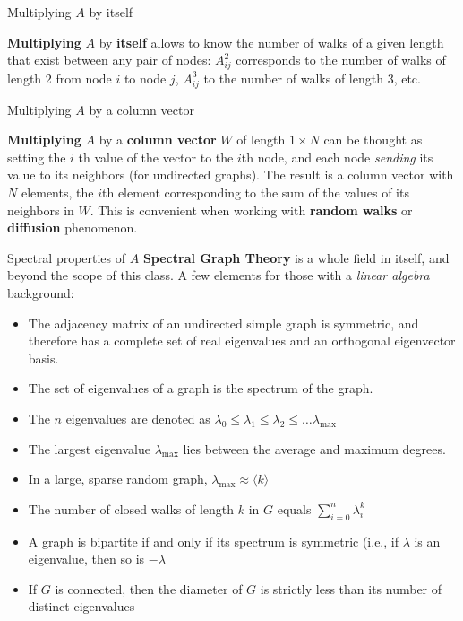 \documentclass[a4paper,11pt]{book}
\begin{document}
\begin{textbox}{Multiplying $A$ by itself}


\textbf{Multiplying} $A$ by \textbf{itself} allows to know the number of walks of a given length that exist between any pair of nodes: $A^2_{ij}$ corresponds to the number of walks of length 2 from node $i$ to node $j$, $A^3_{ij}$ to the number of walks of length 3, etc.
\end{textbox}

\begin{textbox}{Multiplying $A$ by a column vector}

\textbf{Multiplying} $A$ by a \textbf{column vector} $W$ of length $1\times N$ can be thought as setting the $i$ th value of the vector to the $i$th node, and each node \textit{sending} its value to its neighbors (for undirected graphs). The result is a column vector with $N$ elements, the $i$th element corresponding to the sum of the values of its neighbors in $W$. This is convenient when working with \textbf{random walks} or \textbf{diffusion} phenomenon.
\end{textbox}










\begin{textbox}{Spectral properties of $A$}
\textbf{Spectral Graph Theory} is a whole field in itself, and beyond the scope of this class. A few elements for those with a \textit{linear algebra} background:

\begin{itemize}
    \item The adjacency matrix of an undirected simple graph is symmetric, and therefore has a complete set of real eigenvalues and an orthogonal eigenvector basis.
    \item The set of eigenvalues of a graph is the spectrum of the graph.
    \item The $n$ eigenvalues are denoted as $\lambda_0 \leq \lambda_1 \leq \lambda_2 \leq \dots \lambda_{\max}$
    \item The largest eigenvalue $\lambda_{\max}$ lies between the average and maximum degrees.
    \item In a large, sparse random graph, $\lambda_{\max}\approx \langle k \rangle$
    \item The number of closed walks of length $k$ in $G$ equals $\sum^n_{i=0} \lambda^k_i$
    \item A graph is bipartite if and only if its spectrum is symmetric (i.e., if $\lambda$ is an eigenvalue, then so is $-\lambda$
    \item If $G$ is connected, then the diameter of $G$ is strictly less than its number of distinct eigenvalues
\end{itemize}


\end{textbox}
\end{document}
